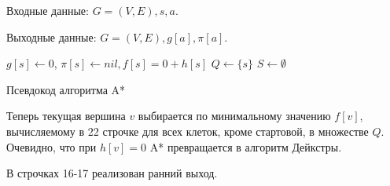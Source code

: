 Входные данные: $G = (V,E), s, a$.

Выходные данные: $G = (V,E), g[a],\pi[a]$.

\begin{algorithm}
\DontPrintSemicolon

$g[s]\gets 0$, $\pi[s] \gets nil, f[s] = 0 + h[s]$\;
$Q \gets \{s\}$\;
$S \gets \emptyset$\;


\caption{Псевдокод алгоритма A*}
\label{pseudoA}
\end{algorithm}

Теперь текущая вершина $v$ выбирается по минимальному значению $f[v]$, вычисляемому в 22 строчке для всех клеток, кроме стартовой, в множестве $Q$. Очевидно, что при $h[v]=0$ A* превращается в алгоритм Дейкстры.

В строчках 16-17 реализован ранний выход.







